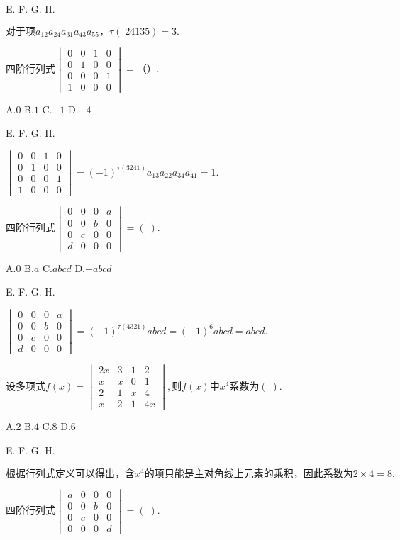 E.   F.   G.   H.

$\mathrm{对于项}a_{12}a_{24}a_{31}a_{43}a_{55}，\tau(\;24135)=3.$


$\mathrm{四阶行列式}\begin{vmatrix}0&0&1&0\\0&1&0&0\\0&0&0&1\\1&0&0&0\end{vmatrix}=（）.$

A.$0$   B.$1$   C.$-1$   D.$-4$

E.   F.   G.   H.

$\begin{vmatrix}0&0&1&0\\0&1&0&0\\0&0&0&1\\1&0&0&0\end{vmatrix}=(-1)^{\tau(3241)}a_{13}a_{22}a_{34}a_{41}=1.$


$\mathrm{四阶行列式}\begin{vmatrix}0&0&0&a\\0&0&b&0\\0&c&0&0\\d&0&0&0\end{vmatrix}=(\;).$

A.$0$   B.$a$   C.$abcd$   D.$-abcd$

E.   F.   G.   H.

$\begin{vmatrix}0&0&0&a\\0&0&b&0\\0&c&0&0\\d&0&0&0\end{vmatrix}=(-1)^{\tau(4321)}abcd=(-1)^6abcd=abcd.$


$\mathrm{设多项式}f(x)=\begin{vmatrix}2x&3&1&2\\x&x&0&1\\2&1&x&4\\x&2&1&4x\end{vmatrix},则f(x)中x^4\mathrm{系数为}(\;).$

A.$2$   B.$4$   C.$8$   D.$6$

E.   F.   G.   H.

$\mathrm{根据行列式定义可以得出}，含x^4\mathrm{的项只能是主对角线上元素的乘积}，\mathrm{因此系数为}2\times4=8.$


$\mathrm{四阶行列式}\begin{vmatrix}a&0&0&0\\0&0&b&0\\0&c&0&0\\0&0&0&d\end{vmatrix}=(\;).$

